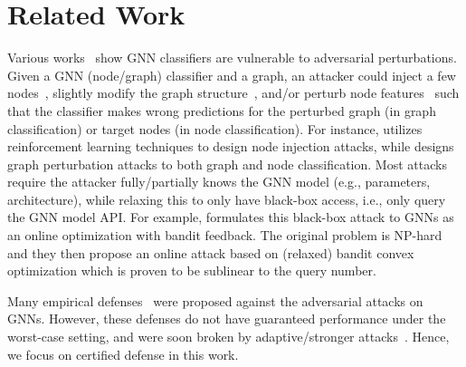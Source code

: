 \section{Related Work}
\label{sec:related}

 Various  works~\cite{zugner2018adversarial,dai2018adversarial,wu2019adversarial,wang2019attacking,xu2019topology,sun2020adversarial,zhang2021backdoor,wan2021adversarial,zhang2022projective,ma2020towards,mu2021a,wang2022bandits,wang2023turning,chenunderstanding,ju2023let,wang2024efficient} show GNN classifiers are vulnerable to adversarial perturbations. Given a GNN (node/graph) classifier and a graph, an attacker could inject a few nodes~\cite{sun2020adversarial,ju2023let}, slightly modify the graph structure~\cite{zugner2018adversarial,dai2018adversarial,xu2019topology}, and/or perturb node features~\cite{zugner2018adversarial} such that the classifier makes wrong predictions for the perturbed graph (in graph classification) or target nodes (in node classification).    
For instance, \cite{sun2020adversarial} utilizes reinforcement learning techniques to design node injection attacks, while \cite{dai2018adversarial} designs graph perturbation attacks to both graph and node classification.  
Most attacks require the attacker fully/partially knows the GNN model (e.g., parameters, architecture), while \cite{mu2021a,wang2022bandits} relaxing this to  only have black-box access, i.e., only query the GNN model API. For example,  \cite{wang2022bandits} formulates this black-box attack to GNNs as an online optimization with bandit feedback. The original problem is NP-hard and they then propose an online attack based on (relaxed) bandit convex optimization which is proven to be {sublinear} to the query number. 

\vspace{+0.05in}
Many empirical defenses~\cite{wu2019adversarial,xu2019topology,zhu2019robust,entezari2020all,tao2021adversarial,zhao2021expressive} were proposed against the adversarial attacks on GNNs. However, these defenses do not have guaranteed performance under the worst-case setting, and were soon broken by adaptive/stronger  attacks~\cite{mujkanovic2022defenses}. Hence, we focus on certified defense in this work. 

